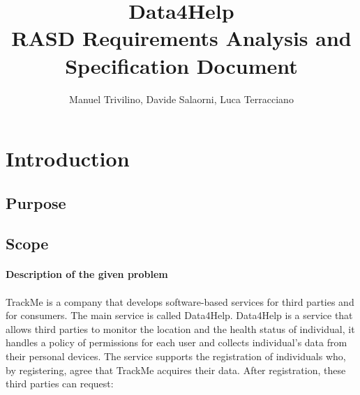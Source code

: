 \documentclass[a4paper]{article}
\begin{document}
    
    \author{Manuel Trivilino, Davide Salaorni, Luca Terracciano}
    
    \title{\Large Data4Help\\
    \Large RASD Requirements Analysis and Specification Document
    }
    
    \maketitle
    \newpage
    
    \tableofcontents
    \newpage
    
    \section{Introduction}
    
    \subsection{Purpose}
    
    \subsection{Scope}
    
    \paragraph{Description of the given problem}
    
    \paragraph{}
    TrackMe is a company that develops software-based services for third parties and for consumers. The main service is called Data4Help.
     Data4Help is a service that allows third parties to monitor the location and the health status of individual, it handles a policy of permissions for each user and collects individual’s data from their personal devices.
    The service supports the registration of individuals who, by registering, agree that TrackMe acquires their data. After registration, these third parties can request:
    
\end{document}
